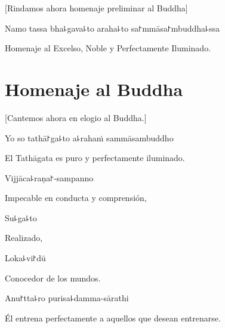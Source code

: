 \begin{english}
  [Rindamos ahora homenaje preliminar al Buddha]
\end{english}

\vspace{\baselineskip}

Namo tassa bha꜕gava꜕to araha꜕to sa꜓mmāsa꜓mbuddha꜕ssa


\begin{english}
  Homenaje al Excelso, Noble y Perfectamente Iluminado.

\end{english}

\clearpage

\chapter{Homenaje al Buddha}

\begin{leader}
\end{leader}

\begin{english}
  [Cantemos ahora en elogio al Buddha.]
\end{english}

Yo so tathā꜓ga꜕to a꜕rahaṁ sammāsambuddho

\begin{english}
  El Tathāgata es puro y perfectamente iluminado.
\end{english}

Vijjāca꜕raṇa꜓-sampanno

\begin{english}
  Impecable en conducta y comprensión,
\end{english}

Su꜕ga꜕to

\begin{english}
  Realizado,
\end{english}

Loka꜕vi꜓dū

\begin{english}
  Conocedor de los mundos.
\end{english}

Anu꜓tta꜕ro purisa꜕damma-sārathi

\begin{english}
  Él entrena perfectamente a aquellos que desean entrenarse.
\end{english}

